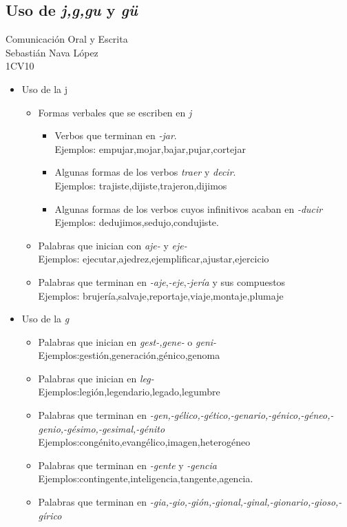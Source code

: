 \documentclass[a4paper,12pt]{article}
\newcommand{\titlehomework}[4]{\begin{center}\section*{#4}{\large #2}\\#1\\#3\\[2ex]\end{center}}
\begin{document}
\titlehomework{Sebastián Nava López}{Comunicación Oral y Escrita}{1CV10}{Uso de \textit{j,g,gu} y \textit{gü}}
\begin{itemize}
\item{Uso de la j
\begin{itemize}
\item{ Formas verbales que se escriben en \textit{j}
\begin{itemize}
\item Verbos que terminan en \textit{-jar}. \\
\phantom{3em}Ejemplos: empujar,mojar,bajar,pujar,cortejar
\item Algunas formas de los verbos \textit{traer} y \textit{decir}. \\
\phantom{3em}Ejemplos: trajiste,dijiste,trajeron,dijimos
\item Algunas formas de los verbos cuyos infinitivos acaban en \textit{-ducir}\\
\phantom{3em}Ejemplos: dedujimos,sedujo,condujiste.
\end{itemize}
}
\item Palabras que inician con \textit{aje-} y \textit{eje-}\\
\phantom{3em}Ejemplos: ejecutar,ajedrez,ejemplificar,ajustar,ejercicio
\item Palabras que terminan en \textit{-aje},\textit{-eje},\textit{-jería} y sus compuestos\\
\phantom{3em}Ejemplos: brujería,salvaje,reportaje,viaje,montaje,plumaje
\end{itemize}
}
\item{Uso de la \textit{g}
\begin{itemize}
\item Palabras que inician en \textit{gest-,gene-} o \textit{geni-}\\
\phantom{3em}Ejemplos:gestión,generación,génico,genoma
\item Palabras que inician en \textit{leg-}\\
\phantom{3em}Ejemplos:legión,legendario,legado,legumbre
\item Palabras que terminan en \textit{-gen,-gélico,-gético,-genario,-génico,-géneo,-genio,-gésimo,-gesimal,-génito}\\
\phantom{3em}Ejemplos:congénito,evangélico,imagen,heterogéneo
\item Palabras que terminan en \textit{-gente} y \textit{-gencia}\\
\phantom{3em}Ejemplos:contingente,inteligencia,tangente,agencia.
\item Palabras que terminan en \textit{-gia,-gio,-gión,-gional,-ginal,-gionario,-gioso,-gírico}\\

\end{itemize}}
\end{itemize}
\end{document}
